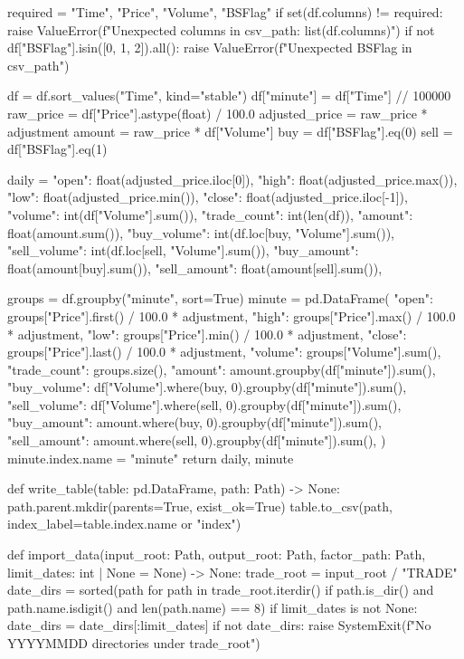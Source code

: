 \documentclass[UTF8,a4paper,fontset=fandol]{ctexart}
\begin{document}
\begin{ProjectCode}
    required = {"Time", "Price", "Volume", "BSFlag"}
    if set(df.columns) != required:
        raise ValueError(f"Unexpected columns in {csv_path}: {list(df.columns)}")
    if not df["BSFlag"].isin([0, 1, 2]).all():
        raise ValueError(f"Unexpected BSFlag in {csv_path}")

    df = df.sort_values("Time", kind="stable")
    df["minute"] = df["Time"] // 100000
    raw_price = df["Price"].astype(float) / 100.0
    adjusted_price = raw_price * adjustment
    amount = raw_price * df["Volume"]
    buy = df["BSFlag"].eq(0)
    sell = df["BSFlag"].eq(1)

    daily = {
        "open": float(adjusted_price.iloc[0]),
        "high": float(adjusted_price.max()),
        "low": float(adjusted_price.min()),
        "close": float(adjusted_price.iloc[-1]),
        "volume": int(df["Volume"].sum()),
        "trade_count": int(len(df)),
        "amount": float(amount.sum()),
        "buy_volume": int(df.loc[buy, "Volume"].sum()),
        "sell_volume": int(df.loc[sell, "Volume"].sum()),
        "buy_amount": float(amount[buy].sum()),
        "sell_amount": float(amount[sell].sum()),
    }

    groups = df.groupby("minute", sort=True)
    minute = pd.DataFrame({
        "open": groups["Price"].first() / 100.0 * adjustment,
        "high": groups["Price"].max() / 100.0 * adjustment,
        "low": groups["Price"].min() / 100.0 * adjustment,
        "close": groups["Price"].last() / 100.0 * adjustment,
        "volume": groups["Volume"].sum(),
        "trade_count": groups.size(),
        "amount": amount.groupby(df["minute"]).sum(),
        "buy_volume": df["Volume"].where(buy, 0).groupby(df["minute"]).sum(),
        "sell_volume": df["Volume"].where(sell, 0).groupby(df["minute"]).sum(),
        "buy_amount": amount.where(buy, 0).groupby(df["minute"]).sum(),
        "sell_amount": amount.where(sell, 0).groupby(df["minute"]).sum(),
    })
    minute.index.name = "minute"
    return daily, minute


def write_table(table: pd.DataFrame, path: Path) -> None:
    path.parent.mkdir(parents=True, exist_ok=True)
    table.to_csv(path, index_label=table.index.name or "index")


def import_data(input_root: Path, output_root: Path, factor_path: Path,
                limit_dates: int | None = None) -> None:
    trade_root = input_root / "TRADE"
    date_dirs = sorted(path for path in trade_root.iterdir()
                       if path.is_dir() and path.name.isdigit() and len(path.name) == 8)
    if limit_dates is not None:
        date_dirs = date_dirs[:limit_dates]
    if not date_dirs:
        raise SystemExit(f"No YYYYMMDD directories under {trade_root}")


\end{ProjectCode}
\end{document}
